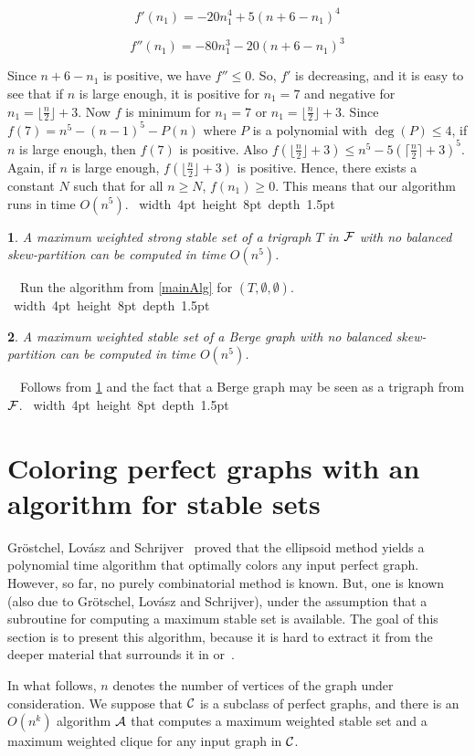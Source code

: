 \documentclass[11 pt] {article}
\newcommand\blackslug{\hbox{\hskip 1pt \vrule width 4pt height 8pt depth 1.5pt
        \hskip 1pt}}
\newcommand\bbox{\hfill \quad \blackslug \medbreak}
\newtheorem{theorem}{}[section]
\newcounter{claim}
\newcommand{\Proof}{\setcounter{claim}{0}\noindent{\bf Proof.}\ \ }
\begin{document}
\[
f'(n_1)=-20n_1^4+5(n+6-n_1)^4
\]

\[
f''(n_1)=-80n_1^3-20(n+6-n_1)^3
\]


Since $n+6-n_1$ is positive, we have $f''\leq 0$.  So, $f'$ is decreasing,
and it is easy to see that if $n$ is large enough, it is positive for
$n_1=7$ and negative for $n_1=\lfloor\frac{n}{2}\rfloor+3$.  Now $f$
is minimum for $n_1=7$ or $n_1=\lfloor\frac{n}{2}\rfloor+3$.  Since
$f(7)=n^5-(n-1)^5-P(n)$ where $P$ is a polynomial with $\deg(P)\leq
4$, if $n$ is large enough, then $f(7)$ is positive.  Also
$f(\lfloor\frac{n}{2}\rfloor+3)\leq n^5-5(\lceil\frac{n}{2}\rceil
+3)^5$. Again, if $n$ is large enough,
$f(\lfloor\frac{n}{2}\rfloor+3)$ is positive.  Hence, there exists a
constant $N$ such that for all $n\geq N$, $f(n_1) \geq 0$.  This means
that our algorithm runs in time $O(n^5)$. \bbox


\begin{theorem}
  \label{t:Strigraph}
  A maximum weighted strong stable set of a trigraph $T$ in $\cal F$ with no
  balanced skew-partition can be computed in time $O(n^5)$.
\end{theorem}
\Proof Run the algorithm from \ref{mainAlg} for $(T, \emptyset,
\emptyset)$.  \bbox


\begin{theorem}
  \label{th:alphaG}
  A maximum weighted stable set of a Berge graph with no balanced skew-partition can be computed in time $O(n^5)$.
\end{theorem}
\Proof Follows from \ref{t:Strigraph} and the fact that a Berge graph may
be seen as a trigraph from $\cal F$.  \bbox

\section{Coloring perfect graphs with an algorithm for stable sets}
\label{sec:color}

Gr\"ostchel, Lov\'asz and Schrijver~\cite{gls:color} proved that the
ellipsoid method yields a polynomial time algorithm that optimally
colors any input perfect graph.  However, so far, no purely
combinatorial method is known.  But, one is known (also due to
Gr\"otschel, Lov\'asz and Schrijver), under the assumption that a
subroutine for computing a maximum stable set is available.  The goal
of this section is to present this algorithm, because it is hard to
extract it from the deeper material that surrounds it in
\cite{gls:color} or~\cite{KrSe:colorP}.


In what follows, $n$ denotes the number of vertices of the graph under
consideration.  We suppose that ${\cal C}$ is a subclass of perfect
graphs, and there is an $O(n^k)$ algorithm ${\cal A}$ that computes a
maximum weighted stable set and a maximum weighted clique for any
input graph in ${\cal C}$.
\end{document}
